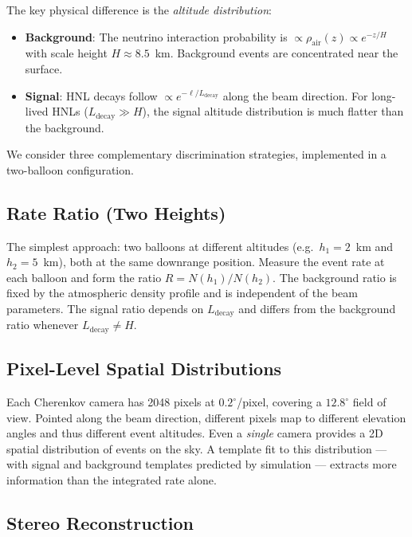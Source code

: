 \documentclass[11pt]{article}
\begin{document}
The key physical difference is the \emph{altitude distribution}:
\begin{itemize}[nosep]
  \item \textbf{Background}: The neutrino interaction probability is
        $\propto \rho_{\text{air}}(z) \propto e^{-z/H}$ with scale
        height $H \approx 8.5$~km.  Background events are concentrated
        near the surface.
  \item \textbf{Signal}: HNL decays follow
        $\propto e^{-\ell/L_{\text{decay}}}$ along the beam direction.
        For long-lived HNLs ($L_{\text{decay}} \gg H$), the signal
        altitude distribution is much flatter than the background.
\end{itemize}

We consider three complementary discrimination strategies, implemented
in a two-balloon configuration.


\subsection{Rate Ratio (Two Heights)}

The simplest approach: two balloons at different altitudes
(e.g.\ $h_1 = 2$~km and $h_2 = 5$~km), both at the same downrange
position.  Measure the event rate at each balloon and form the ratio
$R = N(h_1) / N(h_2)$.  The background ratio is fixed by the
atmospheric density profile and is independent of the beam parameters.
The signal ratio depends on $L_{\text{decay}}$ and differs from the
background ratio whenever $L_{\text{decay}} \neq H$.


\subsection{Pixel-Level Spatial Distributions}

Each Cherenkov camera has 2048 pixels at $0.2^\circ$/pixel, covering a
$12.8^\circ$ field of view.  Pointed along the beam direction, different
pixels map to different elevation angles and thus different event
altitudes.  Even a \emph{single} camera provides a 2D spatial
distribution of events on the sky.  A template fit to this distribution
--- with signal and background templates predicted by simulation ---
extracts more information than the integrated rate alone.


\subsection{Stereo Reconstruction}
\end{document}
